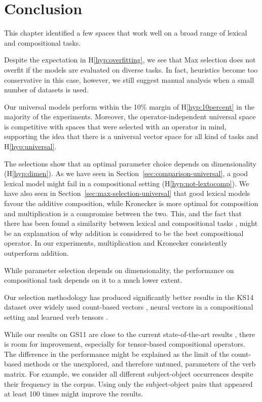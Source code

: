 \section{Conclusion}
\label{sec:conclusion-universal}

This chapter identified a few spaces that work well on a broad range of lexical and compositional tasks.

Despite the expectation in H\ref{hyp:overfitting}, we see that Max selection does not overfit if the models are evaluated on diverse tasks. In fact, heuristics become too conservative in this case, however, we still suggest manual analysis when a small number of datasets is used.

Our universal models perform within the 10\% margin of H\ref{hyp:10percent} in the majority of the experiments. Moreover, the operator-independent universal space is competitive with spaces that were selected with an operator in mind, supporting the idea that there is a universal vector space for all kind of tasks and H\ref{hyp:universal}.

The selections show that an optimal parameter choice depends on dimensionality (H\ref{hyp:dimen}). As we have seen in Section~\ref{sec:comparison-universal}, a good lexical model might fail in a compositional setting (H\ref{hyp:not-lextocomp}). We have also seen in Section~\ref{sec:max-selection-universal} that good lexical models favour the additive composition, while Kronecker is more optimal for composition and multiplication is a compromise between the two. This, and the fact that there has been found a similarity between lexical and compositional tasks \cite[\textcolor{citecolor}{Section~4}]{kiela-clark:2014:CVSC}, might be an explanation of why addition is considered to be the best compositional operator. In our experiments, multiplication and Kronecker consistently outperform addition.

While parameter selection depends on dimensionality, the performance on compositional task depends on it to a much lower extent.

Our selection methodology has produced significantly better results in the KS14 dataset over widely used count-based vectors \cite{milajevs-EtAl:2014:EMNLP2014}, neural vectors in a compositional setting \cite{milajevs-EtAl:2014:EMNLP2014,kim2015neural} and learned verb tensors \cite{fried-polajnar-clark:2015:ACL-IJCNLP,hashimoto-tsuruoka:2016:P16-1,hashimoto-tsuruoka:2015:CVSC}.

While our results on GS11 are close to the current state-of-the-art results \cite{hashimoto-tsuruoka:2016:P16-1}, there is room for improvement, especially for tensor-based compositional operators. The difference in the performance might be explained as the limit of the count-based methods or the unexplored, and therefore untuned, parameters of the verb matrix. For example, we consider all different subject-object occurrences despite their frequency in the corpus. Using only the subject-object pairs that appeared at least 100 times might improve the results.

